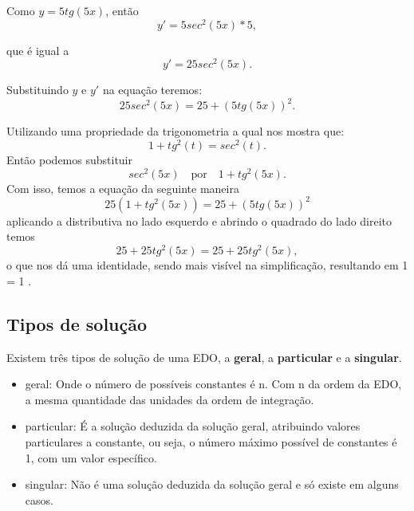 \begin{center}

\begin{flushleft}
Como $y = 5tg(5x)$, então \begin{equation}  y' = 5sec^2(5x) * 5,  \end{equation} 
\end{flushleft}

\begin{flushleft}
que é igual a \begin{equation} y' = 25sec^2(5x).  \end{equation}
\end{flushleft}

\begin{flushleft}
Substituindo $y$ e $y'$ na equação teremos: \begin{equation} 25sec^2(5x) = 25 + (5tg(5x))^2. \end{equation}

Utilizando uma propriedade da trigonometria a qual nos mostra que: \begin{equation} 1 + tg^2(t) = sec^2(t). \end{equation}
Então podemos substituir \begin{equation} sec^2(5x) \quad  \textrm{por} \quad 1 + tg^2(5x). \end{equation}
Com isso, temos a equação da seguinte maneira \begin{equation} 25(1 + tg^2(5x)) = 25 + (5tg(5x))^2 \end{equation} aplicando a distributiva no lado esquerdo e abrindo o quadrado do lado direito temos \begin{equation} 25 + 25tg^2(5x) = 25 + 25tg^2(5x), \end{equation} o que nos dá uma identidade, sendo mais visível na simplificação, resultando em 1 = 1
\cite{explicacaoEDO}.

\end{flushleft}
\end{center}

\subsection[Tipos de solução]{Tipos de solução}
Existem três tipos de solução de uma EDO, a \textbf{geral}, a \textbf{particular} e a \textbf{singular}.
\begin{itemize}
	\item{geral:} Onde o número de possíveis constantes é n. Com n da ordem da EDO, a mesma quantidade das unidades da ordem de integração. 
	\item{particular:} É a solução deduzida da solução geral, atribuindo valores particulares a constante, ou seja, o número máximo possível de constantes é 1, com um valor específico.
	\item{singular:} Não é uma solução deduzida da solução geral e só existe em alguns casos.
\end{itemize}

